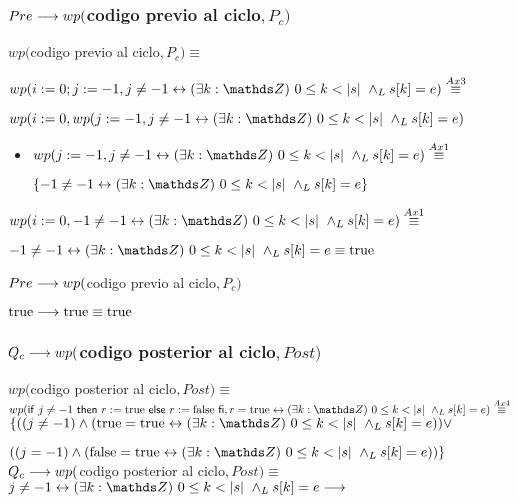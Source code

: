 \documentclass{article}
\begin{document}
\subsubsection*{$Pre \longrightarrow wp($codigo previo al ciclo$, P_{c})$}

$wp($codigo previo al ciclo$, P_{c}) \equiv$

$wp(i:= 0;j:= -1, j \neq -1 \Iff \existe{k}{0}{\longitud{s}} \yLuego s[k] = e) \stackrel{Ax3}{\equiv}$

$wp(i:= 0, wp(j:= -1, j \neq -1 \Iff \existe{k}{0}{\longitud{s}} \yLuego s[k] = e) $

\begin{itemize}
    \item $wp(j:= -1, j \neq -1 \Iff \existe{k}{0}{\longitud{s}} \yLuego s[k] = e)\stackrel{Ax1}{\equiv}$

    $ \{ -1 \neq -1 \Iff \existe{k}{0}{\longitud{s}} \yLuego s[k] = e \} $
\end{itemize}

$wp(i:= 0, -1 \neq -1 \Iff \existe{k}{0}{\longitud{s}} \yLuego s[k] = e) \stackrel{Ax1}{\equiv}$

$ -1 \neq -1 \Iff \existe{k}{0}{\longitud{s}} \yLuego s[k] = e \equiv \True$

$Pre \longrightarrow wp($codigo previo al ciclo$, P_{c})$

$\mathrm{true} \longrightarrow \mathrm{true} \equiv \mathrm{true}$

\subsubsection*{$Q_{c} \longrightarrow wp($codigo posterior al ciclo$, Post)$}

$wp($codigo posterior al ciclo$, Post) \equiv$ \\

$wp(\IfThenElse{j\neq-1}{r:= \True}{r:= \False}, r = \True \Iff \existe{k}{0}{\longitud{s}} \yLuego s[k] = e) \stackrel{Ax4}{\equiv}$\\

$\{ ((j \neq -1) \wedge (\True = \True \Iff \existe{k}{0}{\longitud{s}} \yLuego s[k] = e)) \vee $

$ ((j = -1) \wedge (\False = \True \Iff \existe{k}{0}{\longitud{s}} \yLuego s[k] = e)) \}$ \\

$Q_{c} \longrightarrow wp($codigo posterior al ciclo$, Post) \equiv$ \\

$j \neq -1 \Iff \existe{k}{0}{\longitud{s}} \yLuego s[k] = e \implica$
\end{document}
